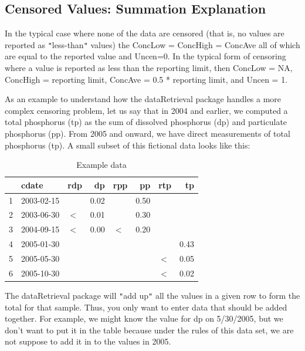 \documentclass[a4paper,11pt]{article}\usepackage[]{graphicx}\usepackage[]{color}
\begin{document}
\subsection{Censored Values: Summation Explanation}
In the typical case where none of the data are censored (that is, no values are reported as \texttt{"}less-than\texttt{"} values) the ConcLow = ConcHigh = ConcAve all of which are equal to the reported value and Uncen=0.  In the typical form of censoring where a value is reported as less than the reporting limit, then ConcLow = NA, ConcHigh = reporting limit, ConcAve = 0.5 * reporting limit, and Uncen = 1.

As an example to understand how the dataRetrieval package handles a more complex censoring problem, let us say that in 2004 and earlier, we computed a total phosphorus (tp) as the sum of dissolved phosphorus (dp) and particulate phosphorus (pp). From 2005 and onward, we have direct measurements of total phosphorus (tp). A small subset of this fictional data looks like this:

\begin{center}

\begin{table}[ht]
\centering
\begin{tabular}{rllrlrlr}
  \hline
 & cdate & rdp & dp & rpp & pp & rtp & tp \\ 
  \hline
1 & 2003-02-15 &  & 0.02 &  & 0.50 &  &  \\ 
  2 & 2003-06-30 & $<$ & 0.01 &  & 0.30 &  &  \\ 
  3 & 2004-09-15 & $<$ & 0.00 & $<$ & 0.20 &  &  \\ 
  4 & 2005-01-30 &  &  &  &  &  & 0.43 \\ 
  5 & 2005-05-30 &  &  &  &  & $<$ & 0.05 \\ 
  6 & 2005-10-30 &  &  &  &  & $<$ & 0.02 \\ 
   \hline
\end{tabular}
\caption{Example data} 
\end{table}



\end{center}


The dataRetrieval package will \texttt{"}add up\texttt{"} all the values in a given row to form the total for that sample. Thus, you only want to enter data that should be added together. For example, we might know the value for dp on 5/30/2005, but we don't want to put it in the table because under the rules of this data set, we are not suppose to add it in to the values in 2005.
\end{document}
